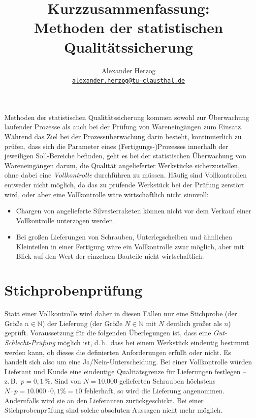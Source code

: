 \documentclass[a4paper,11pt,oneside]{article}
\begin{document}
\title{Kurzzusammenfassung:\\Methoden der statistischen Qualitätssicherung}
\author{Alexander Herzog\\\href{mailto:alexander.herzog@tu-clausthal.de}{\small\texttt{alexander.herzog@tu-clausthal.de}}}
\date{}

\maketitle

Methoden der statistischen Qualitätssicherung kommen sowohl zur Überwachung laufender Prozesse als auch bei der Prüfung von Wareneingängen zum Einsatz. Während das Ziel bei der Prozessüberwachung darin besteht, kontinuierlich zu prüfen, dass sich die Parameter eines (Fertigungs-)Prozesses innerhalb der jeweiligen Soll-Bereiche befinden, geht es bei der statistischen Überwachung von Wareneingängen darum, die Qualität angelieferter Werkstücke sicherzustellen, ohne dabei eine \emph{Vollkontrolle} durchführen zu müssen. Häufig sind Vollkontrollen entweder nicht möglich, da das zu prüfende Werkstück bei der Prüfung zerstört wird, oder aber eine Vollkontrolle wäre wirtschaftlich nicht sinnvoll:

\begin{itemize}
\item
Chargen von angelieferte Silvesterraketen können nicht vor dem Verkauf einer Vollkontrolle unterzogen werden.
\item
Bei großen Lieferungen von Schrauben, Unterlegscheiben und ähnlichen Kleinteilen in einer Fertigung wäre ein Vollkontrolle zwar möglich, aber mit Blick auf den Wert der einzelnen Bauteile nicht wirtschaftlich.
\end{itemize}



\section{Stichprobenprüfung}

Statt einer Vollkontrolle wird daher in diesen Fällen nur eine Stichprobe (der Größe $n\in\mathbb N$) der Lieferung (der Größe $N\in\mathbb N$ mit $N$ deutlich größer als $n$) geprüft. Voraussetzung für die folgenden Überlegungen ist, dass eine \emph{Gut-Schlecht-Prüfung} möglich ist, d.\,h.\ dass bei einem Werkstück eindeutig bestimmt werden kann, ob dieses die definierten Anforderungen erfüllt oder nicht. Es handelt sich also um eine Ja/Nein-Unterscheidung. Bei einer Vollkontrolle würden Lieferant und Kunde eine eindeutige Qualitätsgrenze für Lieferungen festlegen -- z.\,B.\ $p=0{,}1\,\%$. Sind von $N=10.000$ gelieferten Schrauben höchstens $N\cdot p=10.000\cdot0{,}1\%=10$ fehlerhaft, so wird die Lieferung angenommen. Andernfalls wird sie an den Lieferanten zurückgeschickt. Bei einer Stichprobenprüfung sind solche absoluten Aussagen nicht mehr möglich.
\end{document}
